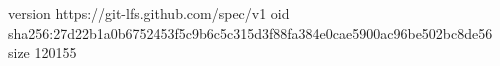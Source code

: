 version https://git-lfs.github.com/spec/v1
oid sha256:27d22b1a0b6752453f5c9b6c5c315d3f88fa384e0cae5900ac96be502bc8de56
size 120155

